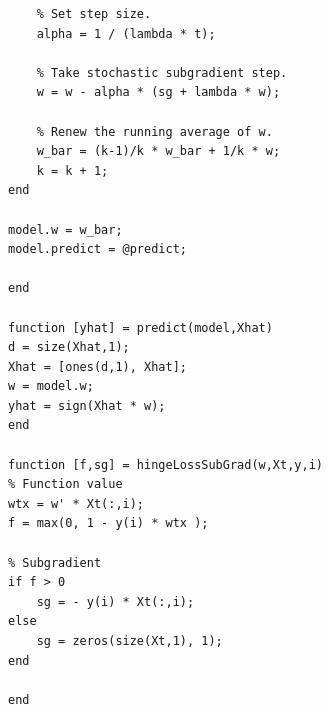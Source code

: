 \documentclass{article}
\begin{document}
\begin{lstlisting}
    % Set step size.
    alpha = 1 / (lambda * t);
    
    % Take stochastic subgradient step.
    w = w - alpha * (sg + lambda * w);
    
    % Renew the running average of w.
    w_bar = (k-1)/k * w_bar + 1/k * w;
    k = k + 1;
end

model.w = w_bar;
model.predict = @predict;

end

function [yhat] = predict(model,Xhat)
d = size(Xhat,1);
Xhat = [ones(d,1), Xhat];
w = model.w;
yhat = sign(Xhat * w);
end

function [f,sg] = hingeLossSubGrad(w,Xt,y,i)
% Function value
wtx = w' * Xt(:,i);
f = max(0, 1 - y(i) * wtx );

% Subgradient
if f > 0
    sg = - y(i) * Xt(:,i);
else
    sg = zeros(size(Xt,1), 1);
end

end
\end{lstlisting}
\end{document}
